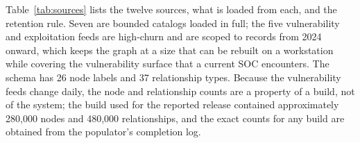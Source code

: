 \documentclass[preprint,12pt,authoryear]{elsarticle}
\begin{document}
Table~\ref{tab:sources} lists the twelve sources, what is loaded from each, and the retention rule. Seven are bounded catalogs loaded in full; the five vulnerability and exploitation feeds are high-churn and are scoped to records from 2024 onward, which keeps the graph at a size that can be rebuilt on a workstation while covering the vulnerability surface that a current SOC encounters. The schema has 26 node labels and 37 relationship types. Because the vulnerability feeds change daily, the node and relationship counts are a property of a build, not of the system; the build used for the reported release contained approximately 280,000 nodes and 480,000 relationships, and the exact counts for any build are obtained from the populator's completion log. \citep{strom2018mitre,mitreCWE,mitreCAPEC,mitreCVE}
\end{document}
